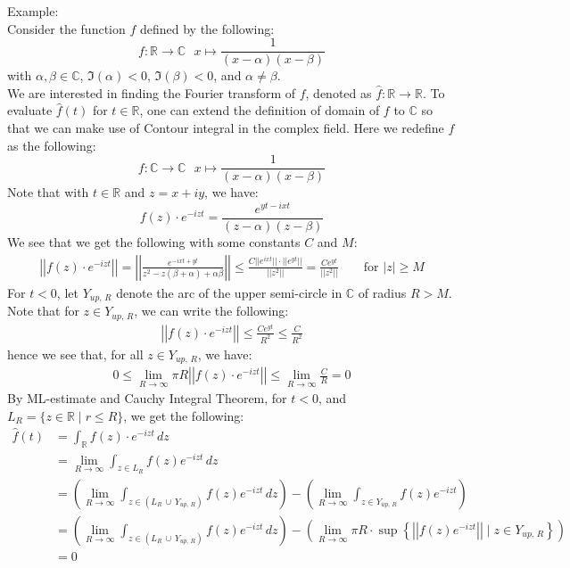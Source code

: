 \documentclass[15pt]{book}
\theoremstyle{break}
\theoremstyle{break}
\newcommand{\R}{\mathbb{R}}
\newcommand{\Complex}{\mathbb{C}}
\newcommand{\example}{\color{green}Example: \color{black}}
\begin{document}
\example\\
Consider the function $f$ defined by the following: 
$$f:\R \to \Complex \ \ \ x\mapsto \frac{1}{(x-\alpha) (x-\beta)}$$ 
with $\alpha,\beta \in \Complex$, $\Im(\alpha)<0$, $\Im(\beta)<0$, and $\alpha \neq \beta$. \\
We are interested in finding the Fourier transform of $f$, denoted as $\hat{f}:\R \to \R$. To evaluate $\hat{f}(t)$ for $t \in \R$, one can extend the definition of domain of $f$ to $\Complex$ so that we can make use of Contour integral in the complex field. Here we redefine $f$ as the following: 
$$f:\Complex \to \Complex \ \ \ x\mapsto \frac{1}{(x-\alpha) (x-\beta)}$$
Note that with $t \in \R$ and $z =x+iy$, we have: 
$$f(z)\cdot e^{-iz t} = \frac{e^{yt - ixt}}{(z-\alpha)(z-\beta)} $$
We see that we get the following with some constants $C$ and $M$:
\begin{align*}
\left|\left|f(z)\cdot e^{-iz t} \right|\right|  = \left|\left| \frac{e^{-ixt+yt}}{z^2 -z(\beta+\alpha)+\alpha\beta} \right|\right| \leq \frac{C||e^{ixt}||\cdot  ||e^{yt}||}{||z^2||} = \frac{Ce^{yt}}{||z^2||} \qquad \text{for }|z| \geq M
\end{align*}
For $t<0$, let $Y_{up,\,R}$ denote the arc of the upper semi-circle in $\Complex$ of radius $R>M$. \\
Note that for $z \in Y_{up,\,R}$, we can write the following:
\begin{align*}
\left|\left|f(z) \cdot e^{-iz t} \right|\right| \leq \frac{Ce^{yt}}{R^2} \leq \frac{C}{R^2}
\end{align*}
hence we see that, for all $z \in Y_{up,\, R}$, we have:
\begin{align*}
0\leq \lim_{R\to \infty} \pi R\left|\left|f(z)\cdot e^{-iz t} \right|\right| \leq \lim_{R\to \infty} \frac{C}{R} = 0
\end{align*}
By ML-estimate and Cauchy Integral Theorem, for $t<0$, and $L_R = \{z \in \R \mid r\leq R\}$, we get the following:
\begin{align*}
\hat{f}(t) 
&= \int_{\R} f(z)\cdot e^{-iz t}\, dz \\
&= \lim_{R\to \infty} \int_{z \in L_R} f(z) e^{-iz t}\, dz\\
&= \left( \lim_{R\to \infty}\int_{z \in (L_R\,\cup\, Y_{up,\,R})} f(z) e^{-iz t}\, dz\right)-\left( \lim_{R\to \infty}\int_{z \in  Y_{up,\,R}} f(z) e^{-iz t}\right)\\
&= \left( \lim_{R\to \infty}\int_{z \in (L_R\,\cup\, Y_{up,\,R})} f(z) e^{-iz t}\, dz \right) - \left(\lim_{R\to \infty} \pi R \cdot \sup\left\{ \left|\left|f(z) e^{-iz t} \right|\right| \mid {z \in  Y_{up,\,R}}\right\}\right)\\
&= 0
\end{align*}
\end{document}
